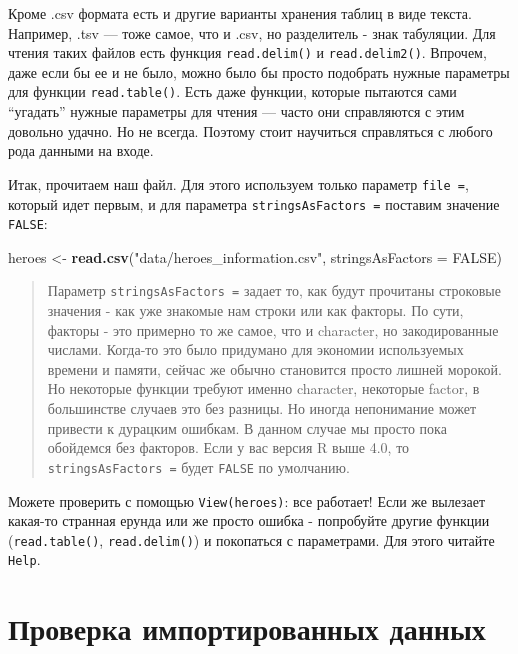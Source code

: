 \documentclass[]{book}
\newenvironment{Shaded}{\begin{snugshade}}{\end{snugshade}}
\newcommand{\KeywordTok}[1]{\textcolor[rgb]{0.13,0.29,0.53}{\textbf{#1}}}
\newcommand{\DataTypeTok}[1]{\textcolor[rgb]{0.13,0.29,0.53}{#1}}
\newcommand{\StringTok}[1]{\textcolor[rgb]{0.31,0.60,0.02}{#1}}
\newcommand{\OtherTok}[1]{\textcolor[rgb]{0.56,0.35,0.01}{#1}}
\newcommand{\NormalTok}[1]{#1}
\begin{document}
Кроме .csv формата есть и другие варианты хранения таблиц в виде текста.
Например, .tsv --- тоже самое, что и .csv, но разделитель - знак
табуляции. Для чтения таких файлов есть функция \texttt{read.delim()} и
\texttt{read.delim2()}. Впрочем, даже если бы ее и не было, можно было
бы просто подобрать нужные параметры для функции \texttt{read.table()}.
Есть даже функции, которые пытаются сами ``угадать'' нужные параметры
для чтения --- часто они справляются с этим довольно удачно. Но не
всегда. Поэтому стоит научиться справляться с любого рода данными на
входе.

Итак, прочитаем наш файл. Для этого используем только параметр
\texttt{file\ =}, который идет первым, и для параметра
\texttt{stringsAsFactors\ =} поставим значение \texttt{FALSE}:

\begin{Shaded}
\begin{Highlighting}[]
\NormalTok{heroes <-}\StringTok{ }\KeywordTok{read.csv}\NormalTok{(}\StringTok{"data/heroes_information.csv"}\NormalTok{, }\DataTypeTok{stringsAsFactors =} \OtherTok{FALSE}\NormalTok{)}
\end{Highlighting}
\end{Shaded}

\begin{quote}
Параметр \texttt{stringsAsFactors\ =} задает то, как будут прочитаны
строковые значения - как уже знакомые нам строки или как факторы. По
сути, факторы - это примерно то же самое, что и character, но
закодированные числами. Когда-то это было придумано для экономии
используемых времени и памяти, сейчас же обычно становится просто лишней
морокой. Но некоторые функции требуют именно character, некоторые
factor, в большинстве случаев это без разницы. Но иногда непонимание
может привести к дурацким ошибкам. В данном случае мы просто пока
обойдемся без факторов. Если у вас версия R выше 4.0, то
\texttt{stringsAsFactors\ =} будет \texttt{FALSE} по умолчанию.
\end{quote}

Можете проверить с помощью \texttt{View(heroes)}: все работает! Если же
вылезает какая-то странная ерунда или же просто ошибка - попробуйте
другие функции (\texttt{read.table()}, \texttt{read.delim()}) и
покопаться с параметрами. Для этого читайте \texttt{Help}.

\section{Проверка импортированных
данных}\label{ux43fux440ux43eux432ux435ux440ux43aux430-ux438ux43cux43fux43eux440ux442ux438ux440ux43eux432ux430ux43dux43dux44bux445-ux434ux430ux43dux43dux44bux445}
\end{document}

